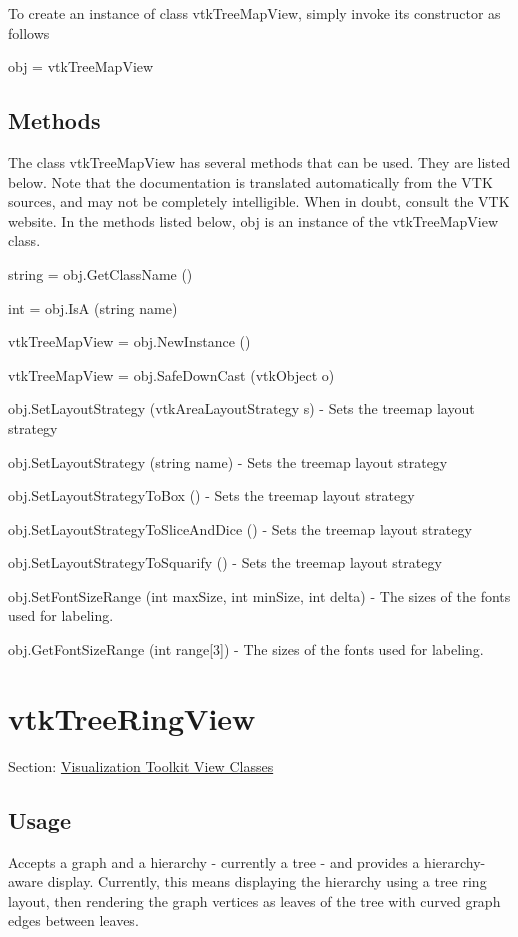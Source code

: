 To create an instance of class vtk\-Tree\-Map\-View, simply invoke its constructor as follows \begin{DoxyVerb}  obj = vtkTreeMapView
\end{DoxyVerb}
 \hypertarget{vtkwidgets_vtkxyplotwidget_Methods}{}\subsection{Methods}\label{vtkwidgets_vtkxyplotwidget_Methods}
The class vtk\-Tree\-Map\-View has several methods that can be used. They are listed below. Note that the documentation is translated automatically from the V\-T\-K sources, and may not be completely intelligible. When in doubt, consult the V\-T\-K website. In the methods listed below, {\ttfamily obj} is an instance of the vtk\-Tree\-Map\-View class. 
\begin{DoxyItemize}
\item {\ttfamily string = obj.\-Get\-Class\-Name ()}  
\item {\ttfamily int = obj.\-Is\-A (string name)}  
\item {\ttfamily vtk\-Tree\-Map\-View = obj.\-New\-Instance ()}  
\item {\ttfamily vtk\-Tree\-Map\-View = obj.\-Safe\-Down\-Cast (vtk\-Object o)}  
\item {\ttfamily obj.\-Set\-Layout\-Strategy (vtk\-Area\-Layout\-Strategy s)} -\/ Sets the treemap layout strategy  
\item {\ttfamily obj.\-Set\-Layout\-Strategy (string name)} -\/ Sets the treemap layout strategy  
\item {\ttfamily obj.\-Set\-Layout\-Strategy\-To\-Box ()} -\/ Sets the treemap layout strategy  
\item {\ttfamily obj.\-Set\-Layout\-Strategy\-To\-Slice\-And\-Dice ()} -\/ Sets the treemap layout strategy  
\item {\ttfamily obj.\-Set\-Layout\-Strategy\-To\-Squarify ()} -\/ Sets the treemap layout strategy  
\item {\ttfamily obj.\-Set\-Font\-Size\-Range (int max\-Size, int min\-Size, int delta)} -\/ The sizes of the fonts used for labeling.  
\item {\ttfamily obj.\-Get\-Font\-Size\-Range (int range\mbox{[}3\mbox{]})} -\/ The sizes of the fonts used for labeling.  
\end{DoxyItemize}\hypertarget{vtkviews_vtktreeringview}{}\section{vtk\-Tree\-Ring\-View}\label{vtkviews_vtktreeringview}
Section\-: \hyperlink{sec_vtkviews}{Visualization Toolkit View Classes} \hypertarget{vtkwidgets_vtkxyplotwidget_Usage}{}\subsection{Usage}\label{vtkwidgets_vtkxyplotwidget_Usage}
Accepts a graph and a hierarchy -\/ currently a tree -\/ and provides a hierarchy-\/aware display. Currently, this means displaying the hierarchy using a tree ring layout, then rendering the graph vertices as leaves of the tree with curved graph edges between leaves.

